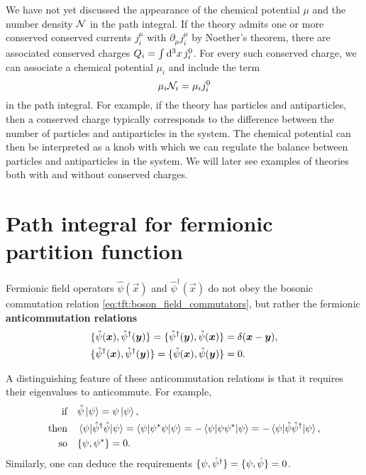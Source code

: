 We have not yet discussed the appearance of the chemical potential $\mu$ and the number density $\mathcal{N}$ in the path integral.
If the theory admits one or more conserved conserved currents $j_i^\mu$ with $\partial_\mu j_i^\mu$ by Noether's theorem, there are associated conserved charges $Q_i = \int \mathop{}\!\mathrm{d}^3 x \, j_i^0$.
For every such conserved charge, we can associate a chemical potential $\mu_i$ and include the term
\begin{equation}
	\mu_i \mathcal{N}_i = \mu_i j_i^0
\label{eq:tft:chemical_potential}
\end{equation}
in the path integral.
For example, if the theory has particles and antiparticles, then a conserved charge typically corresponds to the difference between the number of particles and antiparticles in the system.
The chemical potential can then be interpreted as a knob with which we can regulate the balance between particles and antiparticles in the system.
We will later see examples of theories both with and without conserved charges.


\section{Path integral for fermionic partition function}

\newcommand\creat{\hat\psi^\dagger}
\newcommand\destr{\hat\psi        }


Fermionic field operators $\destr(\vec{x})$ and $\creat(\vec{x})$ do not obey the bosonic commutation relation \eqref{eq:tft:boson_field_commutators}, but rather the fermionic \textbf{anticommutation relations}
\begin{equation}
\begin{split}
	\acomm{\destr(\vec{x})}{\creat(\vec{y})} = \acomm{\creat(\vec{y})}{\destr(\vec{x})} &= \delta(\vec{x}-\vec{y}) , \\
	\acomm{\creat(\vec{x})}{\creat(\vec{y})} = \acomm{\destr(\vec{x})}{\destr(\vec{y})} &= 0 .
\end{split}
\end{equation}

A distinguishing feature of these anticommutation relations is that it requires their eigenvalues to anticommute.
For example,
\begin{equation}
\begin{split}
	\text{if}   \quad & \destr \ket{\psi} = \psi \ket{\psi} , \\
	\text{then} \quad & \braket{\psi | \creat \destr | \psi} = \braket{\psi | \conj\psi \psi | \psi} = -\braket{\psi | \psi \conj\psi | \psi} = -\braket{\psi | \destr \creat | \psi} , \\
	\text{so}  \quad & \acomm{\psi}{\conj\psi} = 0 . \\
\end{split}
\end{equation}
Similarly, one can deduce the requirements $\acomm{\psi}{\creat} = \acomm{\psi}{\destr} = 0$.


